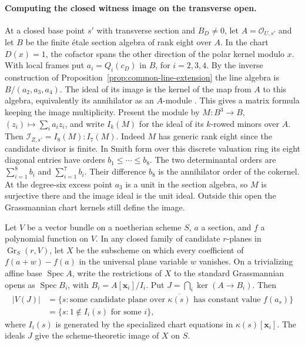 \paragraph{Computing the closed witness image on the transverse open.}
At a closed base point \(s'\) with transverse section and \(B_D\ne0\), let
\(A=\mathcal O_{U,s'}\) and let \(B\) be the finite étale section
algebra of rank eight over \(A\). In the chart \(D(x)=1\), the
cofactor spans the other direction of the polar kernel modulo \(x\).
With local frames put \(a_i=Q_i(c_D)\) in \(B\), for \(i=2,3,4\).
By the inverse construction of Proposition~\ref{prop:common-line-extension}
the line algebra is \(B/(a_2,a_3,a_4)\). The ideal of its image is
the kernel of the map from \(A\) to this algebra, equivalently its
annihilator as an \(A\)-module \cite{stacksSchemeImage}.
This gives a matrix formula keeping the image multiplicity. Present
the module by \(M:B^3\to B\), \((z_i)\mapsto\sum_i a_i z_i\), and
write \(I_k(M)\) for the ideal of its \(k\)-rowed minors over \(A\).
Then \(\mathcal I_{Z,s'}= I_8(M):I_7(M)\).
Indeed \(M\) has generic rank eight since the candidate divisor is
finite. In Smith form over this discrete valuation ring its eight
diagonal entries have orders \(b_1\le\cdots\le b_8\).
The two determinantal orders are \(\sum_{i=1}^8b_i\) and
\(\sum_{i=1}^7b_i\). Their difference \(b_8\) is the annihilator order
of the cokernel. At the degree-six excess point \(a_3\) is a unit
in the section algebra, so \(M\) is surjective there and the image
ideal is the unit ideal. Outside this open the Grassmannian chart
kernels still define the image.

\begin{proposition}
\label{prop:level-existence-image}
Let \(V\) be a vector bundle on a noetherian scheme \(S\), \(a\) a
section, and \(f\) a polynomial function on \(V\). In any closed family
of candidate \(r\)-planes in \(\operatorname{Gr}_S(r,V)\), let \(X\)
be the subscheme on which every coefficient of \(f(a+w)-f(a)\)
in the universal plane variable \(w\) vanishes. On a trivializing
affine base \(\operatorname{Spec} A\), write the restrictions of \(X\)
to the standard Grassmannian opens as
\(\operatorname{Spec} B_i\), with \(B_i=A[\mathbf x_i]/I_i\). Put
\(J=\bigcap_i\ker(A\to B_i)\). Then
\[
\begin{aligned}
 |V(J)|
 &=\{s:\text{some candidate plane over }\overline{\kappa(s)}
                \text{ has constant value } f(a_s)\}\\
 &=\{s:1\notin I_i(s)\text{ for some }i\},
\end{aligned}
\]
where \(I_i(s)\) is generated by the specialized chart equations in
\(\kappa(s)[\mathbf x_i]\). The ideals \(J\) give the scheme-theoretic
image of \(X\) on \(S\).
\end{proposition}

